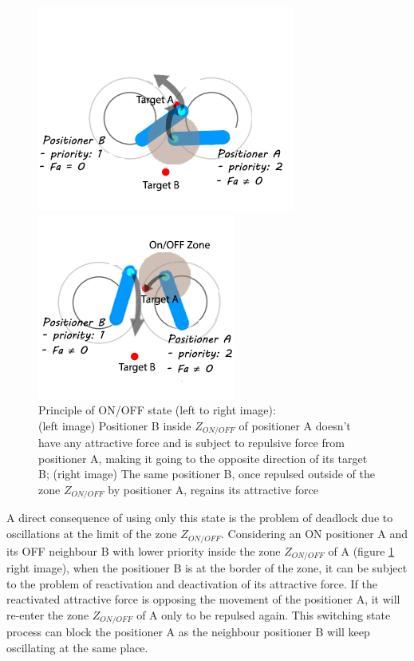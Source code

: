 \documentclass[]{spie}  %
\begin{document}
	\begin{figure}[H]
		\centering
		\begin{minipage}[t]{6.5cm}
			\includegraphics[scale=0.54]{images/first_state_0.jpg}
		\end{minipage}
		\begin{minipage}[t]{5cm}
			\includegraphics[scale=0.54]{images/first_state_ONOFF2.jpg}
		\end{minipage}
		\caption{\centering Principle of ON/OFF state (left to right image): \\
			(left image) Positioner B inside  $Z_{ON/OFF}$ of positioner A doesn't have any attractive force and is subject to repulsive force from positioner A, making it going to the opposite direction of its target B; (right image) The same positioner B, once repulsed outside of the zone $Z_{ON/OFF}$  by positioner A, regains its attractive force\\
\label{key}			}
		\label{First_state}
	\end{figure}
	
	A direct consequence of using only this state is the problem of deadlock due to oscillations at the limit of the zone $Z_{ON/OFF}$. Considering an ON positioner A and its OFF neighbour B with lower priority inside the zone $Z_{ON/OFF}$ of A (figure \ref{First_state} right image), when the positioner B is at the border of the zone, it can be subject to the problem of reactivation and deactivation of its attractive force. If the reactivated attractive force is opposing the movement of the positioner A, it will re-enter the zone $Z_{ON/OFF}$ of A only to be repulsed again. This switching state process can block the positioner A as the neighbour positioner B will keep oscillating at the same place.\\
	
\end{document}
